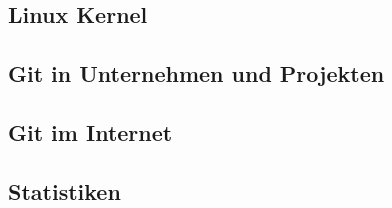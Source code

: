 \chapter{\lookout}
\label{cha:lookout}
\section{Linux Kernel}\label{cha:kernel}
\section{Git in Unternehmen und Projekten}
\section{Git im Internet}
\section{Statistiken}
\chapter{\result}
\label{cha:result}

